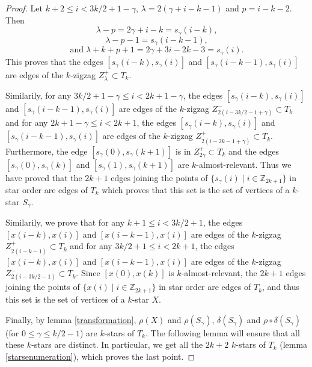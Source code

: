 \documentclass[12pt]{amsart}
\begin{document}
\begin{proof}
Let $k+2\le i< 3k/2+1-\gamma$, $\lambda=2(\gamma+i-k-1)$ and $p=i-k-2$. Then
$$\lambda-p=2\gamma+i-k=s_{\gamma}(i-k),$$
$$\lambda-p-1=s_{\gamma}(i-k-1),$$
$$\mathrm{and}\; \lambda+k+p+1=2\gamma+3i-2k-3=s_\gamma(i).$$
This proves that the edges $[s_{\gamma}(i-k),s_\gamma(i)]$ and $[s_{\gamma}(i-k-1),s_{\gamma}(i)]$ are edges of the $k$-zigzag $Z^+_{\lambda}\subset T_k$.

Similarily, for any $3k/2+1-\gamma\le i< 2k+1-\gamma$, the edges $[s_{\gamma}(i-k),s_\gamma(i)]$ and $[s_{\gamma}(i-k-1),s_\gamma(i)]$ are edges of the $k$-zigzag $Z^-_{2(i-3k/2-1+\gamma)}\subset T_k$ and for any $2k+1-\gamma\le i< 2k+1$, the edges $[s_{\gamma}(i-k),s_\gamma(i)]$ and $[s_{\gamma}(i-k-1),s_\gamma(i)]$ are edges of the $k$-zigzag $Z^+_{2(i-2k-1+\gamma)}\subset T_k$. Furthermore, the edge $[s_\gamma(0),s_{\gamma}(k+1)]$ is in $Z^+_{2\gamma}\subset T_k$ and the edges $[s_\gamma(0),s_{\gamma}(k)]$ and $[s_\gamma(1),s_{\gamma}(k+1)]$ are $k$-almost-relevant. Thus we have proved that the $2k+1$ edges joining the points of $\{s_{\gamma}(i)\;|\; i\in\mathbb{Z}_{2k+1}\}$ in star order are edges of $T_k$ which proves that this set is the set of vertices of a $k$-star $S_{\gamma}$.


\bigskip
Similarily, we prove that for any $k+1\le i< 3k/2+1$, the edges $[x(i-k),x(i)]$ and $[x(i-k-1),x(i)]$ are edges of the $k$-zigzag $Z^+_{2(i-k-1)}\subset T_k$ and for any $3k/2+1\le i< 2k+1$, the edges $[x(i-k),x(i)]$ and $[x(i-k-1),x(i)]$ are edges of the $k$-zigzag $Z^-_{2(i-3k/2-1)}\subset T_k$. Since $[x(0),x(k)]$ is $k$-almost-relevant, the $2k+1$ edges joining the points of $\{x(i)\;|\; i\in\mathbb{Z}_{2k+1}\}$ in star order are edges of $T_k$, and thus this set is the set of vertices of a $k$-star $X$.

\bigskip
Finally, by lemma \ref{transformation}, $\rho(X)$ and $\rho(S_\gamma)$, $\delta(S_\gamma)$ and $\rho\circ\delta(S_\gamma)$ (for $0\le\gamma\le k/2-1$) are $k$-stars of $T_k$. The following lemma will ensure that all these $k$-stars are distinct. In particular, we get all the $2k+2$ $k$-stars of $T_k$ (lemma \ref{starsenumeration}), which proves the last point.
\end{proof}
\end{document}
